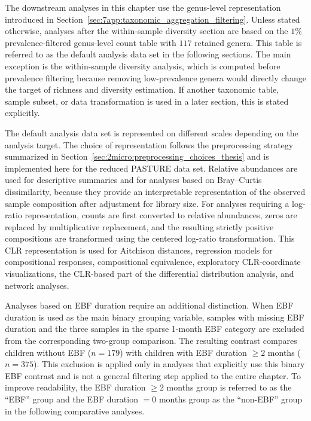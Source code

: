The downstream analyses in this chapter use the genus-level representation introduced in Section~\ref{sec:7app:taxonomic_aggregation_filtering}. Unless stated otherwise, analyses after the within-sample diversity section are based on the $1\%$ prevalence-filtered genus-level count table with $117$ retained genera. This table is referred to as the default analysis data set in the following sections. The main exception is the within-sample diversity analysis, which is computed before prevalence filtering because removing low-prevalence genera would directly change the target of richness and diversity estimation. If another taxonomic table, sample subset, or data transformation is used in a later section, this is stated explicitly.

The default analysis data set is represented on different scales depending on the analysis target. The choice of representation follows the preprocessing strategy summarized in Section~\ref{sec:2micro:preprocessing_choices_thesis} and is implemented here for the reduced PASTURE data set. Relative abundances are used for descriptive summaries and for analyses based on Bray--Curtis dissimilarity, because they provide an interpretable representation of the observed sample composition after adjustment for library size. For analyses requiring a log-ratio representation, counts are first converted to relative abundances, zeros are replaced by multiplicative replacement, and the resulting strictly positive compositions are transformed using the centered log-ratio transformation. This CLR representation is used for Aitchison distances, regression models for compositional responses, compositional equivalence, exploratory CLR-coordinate visualizations, the CLR-based part of the differential distribution analysis, and network analyses.

Analyses based on EBF duration require an additional distinction. When EBF duration is used as the main binary grouping variable, samples with missing EBF duration and the three samples in the sparse 1-month EBF category are excluded from the corresponding two-group comparison. The resulting contrast compares children without EBF ($n=179$) with children with EBF duration $\ge 2$ months ($n=375$). This exclusion is applied only in analyses that explicitly use this binary EBF contrast and is not a general filtering step applied to the entire chapter. To improve readability, the EBF duration $\geq 2$ months group is referred to as the ``EBF'' group and the EBF duration $=0$ months group as the ``non-EBF'' group in the following comparative analyses.

